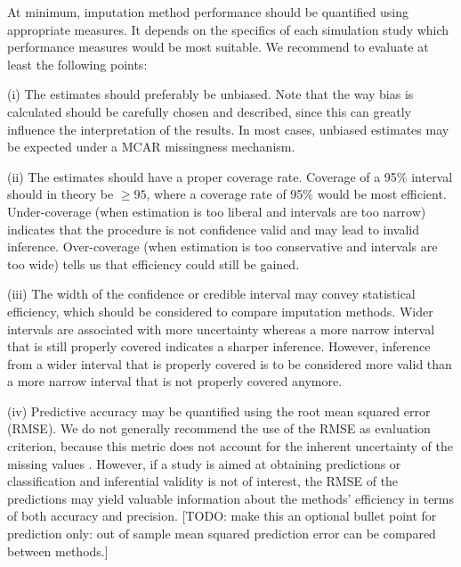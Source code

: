 \documentclass[bimj,fleqn]{w-art}
\begin{document}
At minimum, imputation method performance should be quantified using appropriate measures. It depends on the specifics of each simulation study which performance measures would be most suitable. We recommend to evaluate at least the following points:

(i) The estimates should preferably be unbiased. Note that the way bias is calculated should be carefully chosen and described, since this can greatly influence the interpretation of the results. In most cases, unbiased estimates may be expected under a MCAR missingness mechanism.

(ii) The estimates should have a proper coverage rate. Coverage of a 95\% interval should in theory be $\geq 95$, where a coverage rate of 95\% would be most efficient. Under-coverage (when estimation is too liberal and intervals are too narrow) indicates that the procedure is not confidence valid and may lead to invalid inference. Over-coverage (when estimation is too conservative and intervals are too wide) tells us that efficiency could still be gained. 


(iii) The width of the confidence or credible interval may convey statistical efficiency, which should be considered to compare imputation methods. Wider intervals are associated with more uncertainty whereas a more narrow interval that is still properly covered indicates a sharper inference. However, inference from a wider interval that is properly covered is to be considered more valid than a more narrow interval that is not properly covered anymore. 

(iv) Predictive accuracy may be quantified using the root mean squared error (RMSE). We do not generally recommend the use of the RMSE as evaluation criterion, because this metric does not account for the inherent uncertainty of the missing values \citep[][\S 2.5]{buur18}. However, if a study is aimed at obtaining predictions or classification and inferential validity is not of interest, the RMSE of the predictions may yield valuable information about the methods' efficiency in terms of both accuracy and precision. [TODO: make this an optional bullet point for prediction only: out of sample mean squared prediction error can be compared between methods.]
\end{document}
